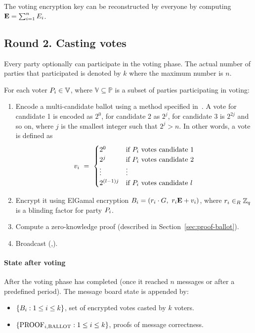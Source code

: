 \documentclass[runningheads]{llncs}
\begin{document}
The voting encryption key \EncryptionKey{} can be reconstructed by everyone by computing $\textbf{E}=\sum_{i=1}^{n} E_{i}$.


\subsection{Round 2. Casting votes}

Every party optionally can participate in the voting phase. The actual number of parties that participated is denoted by $k$ where the maximum number is $n$.

For each voter $P_{i} \in \mathbb{V}$, where $\mathbb{V} \subseteq  \mathbb{P}$ is a subset of parties participating in voting:


\begin{enumerate}
    \item Encode a multi-candidate ballot using a method specified in~\cite{baudronPracticalMulticandidateElection2001}. A vote for candidate 1 is encoded as $2^0$, for candidate 2 as $2^j$, for candidate 3 is $2^{2j}$ and so on, where $j$ is the smallest integer such that $2^j > n$. In other words, a vote is defined as \[v_{i}\ =\ \begin{cases} 2^0 & \text{if } P_i \text{ votes candidate 1} \\ 2^j & \text{if } P_i \text{ votes candidate 2} \\ \vdots & \vdots \\ 2^{(l-1)j} & \text{if } P_i \text{ votes candidate $l$}\end{cases}\]
    
    \item Encrypt it using ElGamal encryption $\Ballot{i} = (\BlindingFactor{i} \cdot \G,\ \BlindingFactor{i} \EncryptionKey{} + \Vote{i})$, where $r_{i} \in_{R} \mathbb{Z}_q$ is a blinding factor for party $P_{i}$.
    
    \item Compute a zero-knowledge proof (described in Section~\ref{sec:proof-ballot}).
    \item Broadcast (,).
\end{enumerate}

\paragraph{State after voting}

After the voting phase has completed (once it reached $n$ messages or after a predefined period). The message board state is appended by:
\begin{itemize}
    \item $\{B_{i} : 1 \leq i \leq k\}$, set of encrypted votes casted by $k$ voters.
    \item $\{\textrm{PROOF}_{i,\textrm{BALLOT}} : 1 \leq i \leq k\}$, proofs of message correctness.
\end{itemize}
\end{document}

